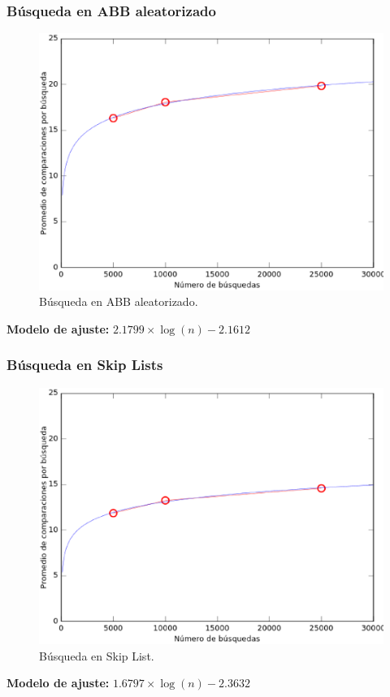 \documentclass[12pt,letterpaper]{article}
\begin{document}
\newpage
\subsubsection{Búsqueda en ABB aleatorizado}
\begin{figure}[ht]
\centering
\includegraphics[scale=0.7]{sABBR.eps}
\caption{Búsqueda en ABB aleatorizado.}
\label{fig:sabbr}
\end{figure}
\textbf{Modelo de ajuste:} $2.1799 \times \log(n) - 2.1612$

\newpage
\subsubsection{Búsqueda en Skip Lists}
\begin{figure}[ht]
\centering
\includegraphics[scale=0.7]{sSL.eps}
\caption{Búsqueda en Skip List.}
\label{fig:ssl}
\end{figure}
\textbf{Modelo de ajuste:} $1.6797 \times \log(n) - 2.3632$
\end{document}
